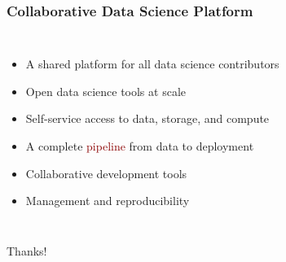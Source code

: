 \documentclass[aspectratio=1610]{beamer}
\begin{document}
\begin{frame}
\frametitle{Collaborative Data Science Platform}
\begin{columns}
\column{37em}
\begin{itemize}\itemsep1em
  \justifying
  \item A \textcolor{Ocean}{shared platform} for all \textcolor{TextGreen}{data science} contributors
  \item Open data science \textcolor{Ocean}{tools at scale}
  \item \textcolor{TextGreen}{Self-service} access to \textcolor{Ocean}{data}, \textcolor{Ocean}{storage}, and \textcolor{Ocean}{compute}
  \item A complete \textcolor{darkred}{pipeline} from data to deployment
  \item Collaborative \textcolor{Ocean}{development tools}
  \item \textcolor{Ocean}{Management} and \textcolor{Ocean}{reproducibility}
\end{itemize}
\end{columns}
\end{frame}

\begin{frame}
\begin{columns}
\column{37em}
\vspace{1cm}
\Huge{\centerline{Thanks!}}
\end{columns}
\end{frame}
\end{document}
